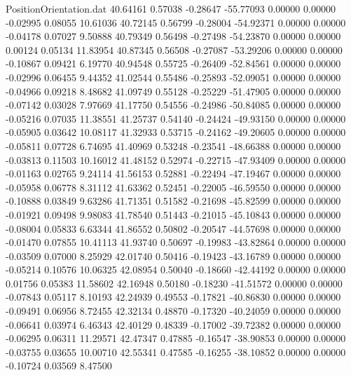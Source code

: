 \begin{filecontents}{PositionOrientation.dat}
  40.64161    0.57038   -0.28647   -55.77093    0.00000    0.00000   -0.02995    0.08055   10.61036
  40.72145    0.56799   -0.28004   -54.92371    0.00000    0.00000   -0.04178    0.07027    9.50888
  40.79349    0.56498   -0.27498   -54.23870    0.00000    0.00000    0.00124    0.05134   11.83954
  40.87345    0.56508   -0.27087   -53.29206    0.00000    0.00000   -0.10867    0.09421    6.19770
  40.94548    0.55725   -0.26409   -52.84561    0.00000    0.00000   -0.02996    0.06455    9.44352
  41.02544    0.55486   -0.25893   -52.09051    0.00000    0.00000   -0.04966    0.09218    8.48682
  41.09749    0.55128   -0.25229   -51.47905    0.00000    0.00000   -0.07142    0.03028    7.97669
  41.17750    0.54556   -0.24986   -50.84085    0.00000    0.00000   -0.05216    0.07035   11.38551
  41.25737    0.54140   -0.24424   -49.93150    0.00000    0.00000   -0.05905    0.03642   10.08117
  41.32933    0.53715   -0.24162   -49.20605    0.00000    0.00000   -0.05811    0.07728    6.74695
  41.40969    0.53248   -0.23541   -48.66388    0.00000    0.00000   -0.03813    0.11503   10.16012
  41.48152    0.52974   -0.22715   -47.93409    0.00000    0.00000   -0.01163    0.02765    9.24114
  41.56153    0.52881   -0.22494   -47.19467    0.00000    0.00000   -0.05958    0.06778    8.31112
  41.63362    0.52451   -0.22005   -46.59550    0.00000    0.00000   -0.10888    0.03849    9.63286
  41.71351    0.51582   -0.21698   -45.82599    0.00000    0.00000   -0.01921    0.09498    9.98083
  41.78540    0.51443   -0.21015   -45.10843    0.00000    0.00000   -0.08004    0.05833    6.63344
  41.86552    0.50802   -0.20547   -44.57698    0.00000    0.00000   -0.01470    0.07855   10.41113
  41.93740    0.50697   -0.19983   -43.82864    0.00000    0.00000   -0.03509    0.07000    8.25929
  42.01740    0.50416   -0.19423   -43.16789    0.00000    0.00000   -0.05214    0.10576   10.06325
  42.08954    0.50040   -0.18660   -42.44192    0.00000    0.00000    0.01756    0.05383   11.58602
  42.16948    0.50180   -0.18230   -41.51572    0.00000    0.00000   -0.07843    0.05117    8.10193
  42.24939    0.49553   -0.17821   -40.86830    0.00000    0.00000   -0.09491    0.06956    8.72455
  42.32134    0.48870   -0.17320   -40.24059    0.00000    0.00000   -0.06641    0.03974    6.46343
  42.40129    0.48339   -0.17002   -39.72382    0.00000    0.00000   -0.06295    0.06311   11.29571
  42.47347    0.47885   -0.16547   -38.90853    0.00000    0.00000   -0.03755    0.03655   10.00710
  42.55341    0.47585   -0.16255   -38.10852    0.00000    0.00000   -0.10724    0.03569    8.47500

\end{filecontents}
